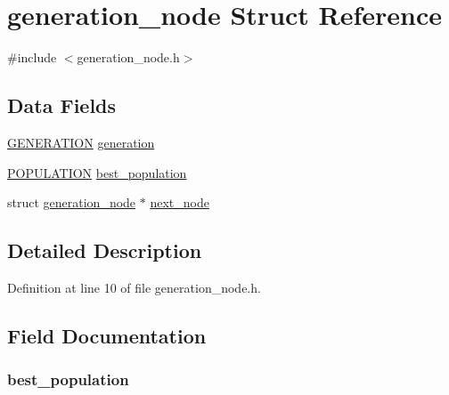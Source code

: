 \hypertarget{structgeneration__node}{}\section{generation\+\_\+node Struct Reference}
\label{structgeneration__node}


{\ttfamily \#include $<$generation\+\_\+node.\+h$>$}

\subsection*{Data Fields}
\begin{DoxyCompactItemize}
\item 
\hyperlink{ag_8h_a652078089189c6f5a5563fd282e8efb4}{G\+E\+N\+E\+R\+A\+T\+I\+O\+N} \hyperlink{structgeneration__node_a40379d9ada9495936ee4f29d634dde80}{generation}
\item 
\hyperlink{ag_8h_a8050698e0bc2d8fb8b06ca11bcd284f3}{P\+O\+P\+U\+L\+A\+T\+I\+O\+N} \hyperlink{structgeneration__node_aebd971e3310ff10c473fd433c2c79850}{best\+\_\+population}
\item 
struct \hyperlink{structgeneration__node}{generation\+\_\+node} $\ast$ \hyperlink{structgeneration__node_a1f033b4ab08a9635b6efe700077b656a}{next\+\_\+node}
\end{DoxyCompactItemize}


\subsection{Detailed Description}


Definition at line 10 of file generation\+\_\+node.\+h.



\subsection{Field Documentation}
\hypertarget{structgeneration__node_aebd971e3310ff10c473fd433c2c79850}{}
\subsubsection[{best\+\_\+population}]{ best\+\_\+population}\label{structgeneration__node_aebd971e3310ff10c473fd433c2c79850}


